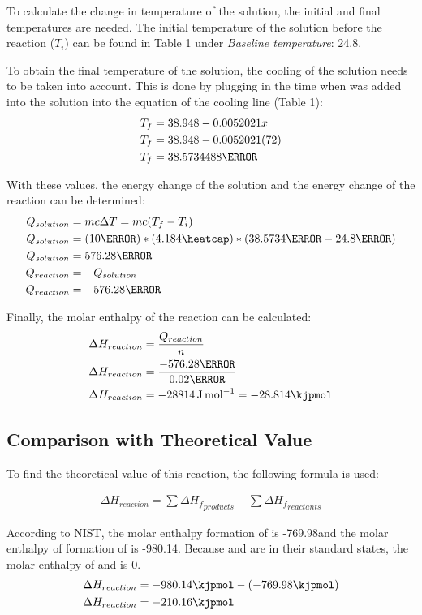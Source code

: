 \documentclass[12pt, notitlepage, letterpaper]{report}
\begin{document}
To calculate the change in temperature of the solution, the initial and final temperatures are needed. The initial temperature of the solution before the reaction ($T_i$) can be found in Table 1 under \textit{Baseline temperature}: 24.8\celsius.

To obtain the final temperature of the solution, the cooling of the solution needs to be taken into account. This is done by plugging in the time when  was added into the solution into the equation of the cooling line (Table 1):
\begin{align*}
	T_f & = 38.948 - 0.0052021x    \\
	T_f & = 38.948 - 0.0052021(72) \\
	T_f & = 38.5734488\celsius
\end{align*}

With these values, the energy change of the solution and the energy change of the reaction can be determined:
\begin{align*}
	Q_{solution} & = mc\Delta T = mc(T_f - T_i)
	\\
	Q_{solution} & = (10\gram) * (4.184\heatcap) * (38.5734\celsius - 24.8\celsius)
	\\
	Q_{solution} & = 576.28\joule
	\\
	Q_{reaction} & = -Q_{solution}
	\\
	Q_{reaction} & = -576.28\joule
\end{align*}

Finally, the molar enthalpy of the reaction can be calculated:
\begin{align*}
	\Delta H_{reaction} & = \frac{Q_{reaction}}{n}                         \\
	\Delta H_{reaction} & = \frac{-576.28\joule}{0.02\mol}                 \\
	\Delta H_{reaction} & = -28814\,\unit{\joule\per\mol} = -28.814\kjpmol
\end{align*}

\subsection*{Comparison with Theoretical Value}
To find the theoretical value of this reaction, the following formula is used:

\begin{align*}
	\Delta H_{reaction} = \sum \Delta {H_f}_{products} - \sum \Delta {H_f}_{reactants}
\end{align*}

According to NIST, the molar enthalpy formation of  is -769.98\kjpmol and the molar enthalpy of formation of  is -980.14\kjpmol . Because  and  are in their standard states, the molar enthalpy of  and  is 0\kjpmol .
\begin{align*}
	\Delta H_{reaction} & = -980.14\kjpmol - (-769.98\kjpmol) \\
	\Delta H_{reaction} & = -210.16\kjpmol
\end{align*}
\end{document}
